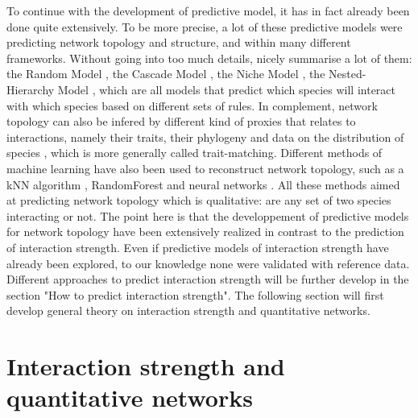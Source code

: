 \documentclass[english,12pt]{article}
\begin{document}
To continue with the development of predictive model, it has in fact already been done quite extensively. To be more precise, a lot of these predictive models were predicting network topology and structure, and within many different frameworks. Without going into too much details, \cite{Pascual2005EcoNet} nicely summarise a lot of them: the Random Model \citep{cohen1977FooWeb}, the Cascade Model \citep{Cohen1985StoThe}, the Niche Model \citep{Williams2000SimRul}, the Nested-Hierarchy Model \citep{Cattin2004PhyCon}, which are all models that predict which species will interact with which species based on different sets of rules. In complement, network topology can also be infered by different kind of proxies that relates to interactions, namely their traits, their phylogeny and data on the distribution of species \citep{Morales-Castilla2015InfBio}, which is more generally called trait-matching. Different methods of machine learning have also been used to reconstruct network topology, such as a kNN algorithm \citep{Desjardins-Proulx2017EcoInt}, RandomForest and neural networks \citep{Pichler2020MacLea}. All these methods aimed at predicting network topology which is qualitative: are any set of two species interacting or not. The point here is that the developpement of predictive models for network topology have been extensively realized in contrast to the prediction of interaction strength. Even if predictive models of interaction strength have already been explored, to our knowledge none were validated with reference data. Different approaches to predict interaction strength will be further develop in the section "How to predict interaction strength". The following section will first develop general theory on interaction strength and quantitative networks.


\section{Interaction strength and quantitative networks}
\end{document}
